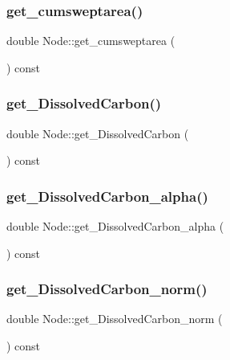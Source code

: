 \mbox{\label{class_node_a042cbd851c706cd16498c8bd1754a7f3}} 
\subsubsection{\texorpdfstring{get\_cumsweptarea()}{get\_cumsweptarea()}}
{\footnotesize\ttfamily double Node\+::get\+\_\+cumsweptarea (\begin{DoxyParamCaption}{ }\end{DoxyParamCaption}) const}

\mbox{\label{class_node_a3a12a212ed94e99afeccb4dfdbc3f27f}} 
\subsubsection{\texorpdfstring{get\_DissolvedCarbon()}{get\_DissolvedCarbon()}}
{\footnotesize\ttfamily double Node\+::get\+\_\+\+Dissolved\+Carbon (\begin{DoxyParamCaption}{ }\end{DoxyParamCaption}) const}

\mbox{\label{class_node_a1d92235c77860d05d804cd40cf81c219}} 
\subsubsection{\texorpdfstring{get\_DissolvedCarbon\_alpha()}{get\_DissolvedCarbon\_alpha()}}
{\footnotesize\ttfamily double Node\+::get\+\_\+\+Dissolved\+Carbon\+\_\+alpha (\begin{DoxyParamCaption}{ }\end{DoxyParamCaption}) const}

\mbox{\label{class_node_ada4f8fddd4cf702172a95b2b18bcd910}} 
\subsubsection{\texorpdfstring{get\_DissolvedCarbon\_norm()}{get\_DissolvedCarbon\_norm()}}
{\footnotesize\ttfamily double Node\+::get\+\_\+\+Dissolved\+Carbon\+\_\+norm (\begin{DoxyParamCaption}{ }\end{DoxyParamCaption}) const}

